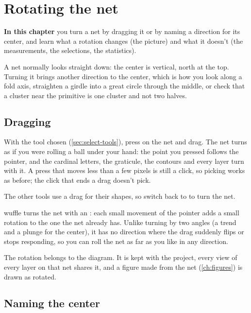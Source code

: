 \chapter{Rotating the net}\label{ch:rotation}
\begin{goals}
\textbf{In this chapter} you turn a net by dragging it or by naming a direction for its center, and learn
what a rotation changes (the picture) and what it doesn't (the measurements, the selections, the
statistics).
\end{goals}

A net normally looks straight down: the center is vertical, north at the top. Turning it brings another
direction to the center, which is how you look along a fold axis, straighten a girdle into a great circle
through the middle, or check that a cluster near the primitive is one cluster and not two halves.

\section{Dragging}\label{sec:rotate-drag}

With the  tool chosen (\cref{sec:select-tools}), press on the net and drag. The net turns as if
you were rolling a ball under your hand: the point you pressed follows the pointer, and the cardinal
letters, the graticule, the contours and every layer turn with it. A press that moves less than a few
pixels is still a click, so picking works as before; the click that ends a drag doesn't pick.

The other tools use a drag for their shapes, so switch back to  to turn the net.

\begin{why}
wuffle turns the net with an : each small movement of the pointer adds a small rotation to
the one the net already has. Unlike turning by two angles (a trend and a plunge for the center), it has no
direction where the drag suddenly flips or stops responding, so you can roll the net as far as you like in
any direction.
\end{why}

The rotation belongs to the diagram. It is kept with the project, every view of every layer on that net
shares it, and a figure made from the net (\cref{ch:figures}) is drawn as rotated.

\section{Naming the center}\label{sec:rotate-centre}


